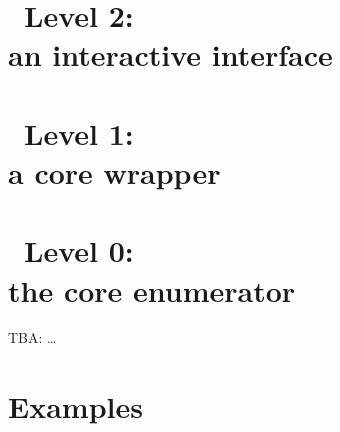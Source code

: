 \documentclass[12pt,a4paper,twoside]{repcram}
\begin{document}

\chapter{\ace\ Level 2: \\ an interactive interface}



\chapter{\ace\ Level 1: \\ a core wrapper}



\chapter{\ace\ Level 0: \\ the core enumerator}
%

TBA: \dots



%

% 
% 


\clearpage
\appendix

\chapter{Examples}\label{app:ex}



\clearpage




\end{document}
